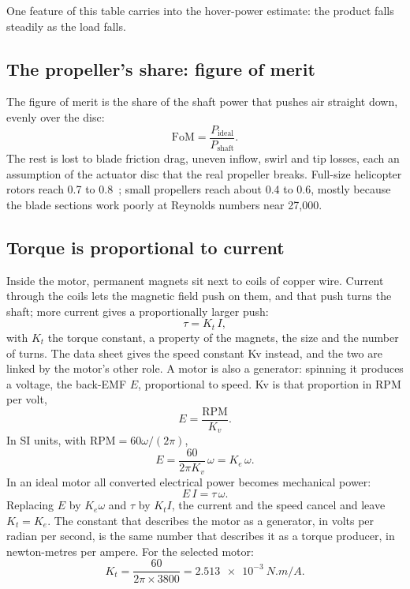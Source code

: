 One feature of this table carries into the hover-power estimate: the product falls steadily as the load falls.

\subsection{The propeller's share: figure of merit}

The figure of merit is the share of the shaft power that pushes air straight down, evenly over the disc:
\begin{equation}
\text{FoM} = \frac{P_\text{ideal}}{P_\text{shaft}}.
\end{equation}
The rest is lost to blade friction drag, uneven inflow, swirl and tip losses, each an assumption of the actuator disc that the real propeller breaks. Full-size helicopter rotors reach 0.7 to 0.8~\citep{leishman}; small propellers reach about 0.4 to 0.6, mostly because the blade sections work poorly at Reynolds numbers near 27,000.

\subsection{Torque is proportional to current}

Inside the motor, permanent magnets sit next to coils of copper wire. Current through the coils lets the magnetic field push on them, and that push turns the shaft; more current gives a proportionally larger push:
\begin{equation}
\tau = K_t\, I,
\end{equation}
with $K_t$ the torque constant, a property of the magnets, the size and the number of turns. The data sheet gives the speed constant Kv instead, and the two are linked by the motor's other role. A motor is also a generator: spinning it produces a voltage, the back-EMF $E$, proportional to speed. Kv is that proportion in RPM per volt,
\begin{equation}
E = \frac{\text{RPM}}{K_v}.
\end{equation}
In SI units, with $\text{RPM} = 60\omega/(2\pi)$,
\begin{equation}
E = \frac{60}{2\pi K_v}\, \omega = K_e\, \omega.
\end{equation}
In an ideal motor all converted electrical power becomes mechanical power:
\begin{equation}
E\, I = \tau\, \omega.
\end{equation}
Replacing $E$ by $K_e\omega$ and $\tau$ by $K_t I$, the current and the speed cancel and leave $K_t = K_e$. The constant that describes the motor as a generator, in volts per radian per second, is the same number that describes it as a torque producer, in newton-metres per ampere. For the selected motor:
\begin{equation}
K_t = \frac{60}{2\pi \times 3800} = \SI{2.513e-3}{N.m/A}.
\end{equation}

